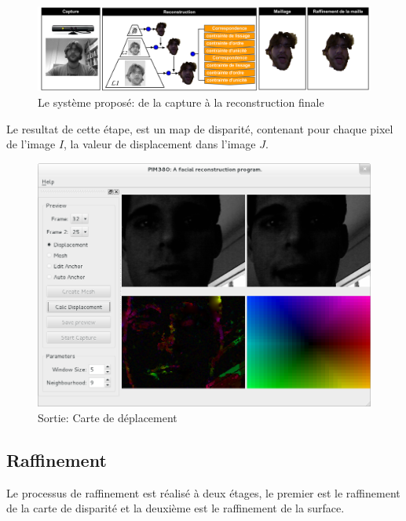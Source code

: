 \documentclass[a4paper,12pt]{article}
\begin{document}
\begin{figure}[ht!]
  \begin{center}
    \includegraphics[scale=0.35]{img/projSystem.png}
    \caption{Le système proposé: de la capture à la reconstruction finale}
  \end{center}
\end{figure}

Le resultat de cette étape, est un map de disparité, contenant pour
chaque pixel de l'image $I$, la valeur de displacement dans l'image
$J$. 

\begin{figure}[ht!]
  \begin{center}
    \includegraphics[scale=0.4]{img/dispMap.png}
    \caption{Sortie: Carte de déplacement}
  \end{center}
\end{figure}



\subsection{Raffinement}

Le processus de raffinement est réalisé à deux étages, le premier est le
raffinement de la carte de disparité et la deuxième est le raffinement
de la surface.  
\end{document}
